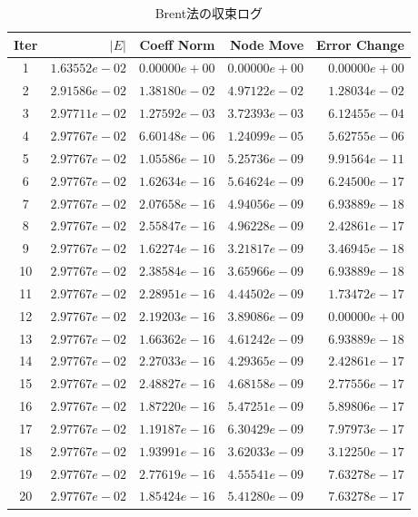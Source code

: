 \begin{table}[H]
 \centering
 \caption{Brent法の収束ログ}
 \label{tab:remes-brent-log}
 \begin{tabular}{crrrr}
 \toprule
 Iter & $|E|$ & Coeff Norm & Node Move & Error Change \\
 \midrule
 1 & $1.63552e-02$ & $0.00000e+00$ & $0.00000e+00$ & $0.00000e+00$ \\
 2 & $2.91586e-02$ & $1.38180e-02$ & $4.97122e-02$ & $1.28034e-02$ \\
 3 & $2.97711e-02$ & $1.27592e-03$ & $3.72393e-03$ & $6.12455e-04$ \\
 4 & $2.97767e-02$ & $6.60148e-06$ & $1.24099e-05$ & $5.62755e-06$ \\
 5 & $2.97767e-02$ & $1.05586e-10$ & $5.25736e-09$ & $9.91564e-11$ \\
 6 & $2.97767e-02$ & $1.62634e-16$ & $5.64624e-09$ & $6.24500e-17$ \\
 7 & $2.97767e-02$ & $2.07658e-16$ & $4.94056e-09$ & $6.93889e-18$ \\
 8 & $2.97767e-02$ & $2.55847e-16$ & $4.96228e-09$ & $2.42861e-17$ \\
 9 & $2.97767e-02$ & $1.62274e-16$ & $3.21817e-09$ & $3.46945e-18$ \\
 10 & $2.97767e-02$ & $2.38584e-16$ & $3.65966e-09$ & $6.93889e-18$ \\
 11 & $2.97767e-02$ & $2.28951e-16$ & $4.44502e-09$ & $1.73472e-17$ \\
 12 & $2.97767e-02$ & $2.19203e-16$ & $3.89086e-09$ & $0.00000e+00$ \\
 13 & $2.97767e-02$ & $1.66362e-16$ & $4.61242e-09$ & $6.93889e-18$ \\
 14 & $2.97767e-02$ & $2.27033e-16$ & $4.29365e-09$ & $2.42861e-17$ \\
 15 & $2.97767e-02$ & $2.48827e-16$ & $4.68158e-09$ & $2.77556e-17$ \\
 16 & $2.97767e-02$ & $1.87220e-16$ & $5.47251e-09$ & $5.89806e-17$ \\
 17 & $2.97767e-02$ & $1.19187e-16$ & $6.30429e-09$ & $7.97973e-17$ \\
 18 & $2.97767e-02$ & $1.93991e-16$ & $3.62033e-09$ & $3.12250e-17$ \\
 19 & $2.97767e-02$ & $2.77619e-16$ & $4.55541e-09$ & $7.63278e-17$ \\
 20 & $2.97767e-02$ & $1.85424e-16$ & $5.41280e-09$ & $7.63278e-17$ \\
 \bottomrule
 \end{tabular}
\end{table}

